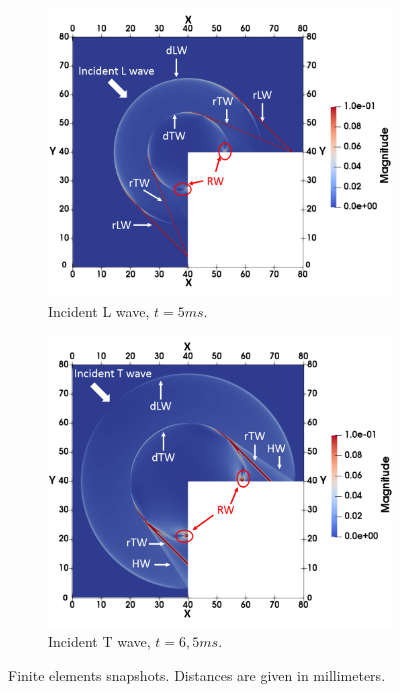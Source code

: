 \begin{figure}
\centering
    \begin{subfigure}[b]{0.49\textwidth}
        \includegraphics[width=\textwidth]{images/chapter3/Figure10a.pdf}
        \caption{Incident L wave, $t=5ms$.}
        \label{snapLL}
    \end{subfigure}  
     \begin{subfigure}[b]{0.49\textwidth}
        \includegraphics[width=\textwidth]{images/chapter3/Figure10b.pdf}
        \caption{Incident T wave, $t=6,5ms$. }
        \label{snapTL}
    \end{subfigure}
     \caption{Finite elements snapshots. Distances are given in millimeters. }
     \label{snap}
\end{figure}


